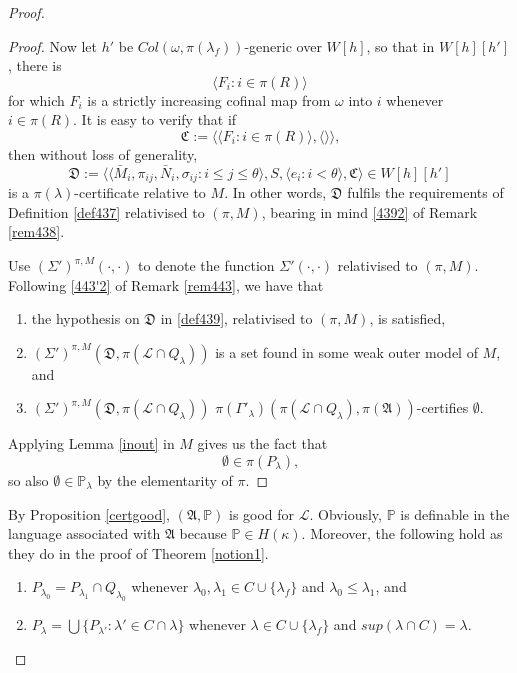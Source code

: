 \documentclass[12pt, twoside]{memoir}
\numberwithin{equation}{section}
\theoremstyle{definition}
\theoremstyle{remark}
\theoremstyle{definition}
\theoremstyle{definition}
\theoremstyle{definition}
\theoremstyle{remark}
\begin{document}
\begin{proof}
\begin{proof}
Now let $h'$ be $Col(\omega, \pi(\lambda_f))$-generic over $W[h]$, so that in $W[h][h']$, there is 
\begin{equation*}
    \langle F_i : i \in \pi(R) \rangle
\end{equation*}
for which $F_i$ is a strictly increasing cofinal map from $\omega$ into $i$ whenever $i \in \pi(R)$. It is easy to verify that if
\begin{equation*}
    \mathfrak{C} := \langle \langle F_i : i \in \pi(R) \rangle, \langle \rangle \rangle \text{,}
\end{equation*}
then without loss of generality,
\begin{equation*}
    \mathfrak{D} := \langle \langle \bar{M}_i, \pi_{ij},  \bar{N}_i, \sigma_{ij} : i \leq j \leq \theta \rangle, S, \langle e_i : i < \theta \rangle, \mathfrak{C} \rangle \in W[h][h']
\end{equation*}
is a $\pi(\lambda)$-certificate relative to $M$. In other words, $\mathfrak{D}$ fulfils the requirements of Definition \ref{def437} relativised to $(\pi, M)$, bearing in mind \ref{4392} of Remark \ref{rem438}. 

Use $(\Sigma')^{\pi, M}(\cdot, \cdot)$ to denote the function $\Sigma'(\cdot, \cdot)$ relativised to $(\pi, M)$. Following \ref{443'2} of Remark \ref{rem443}, we have that
\begin{enumerate}[label=(\alph*)]
    \item the hypothesis on $\mathfrak{D}$ in \ref{def439}, relativised to $(\pi, M)$, is satisfied, 
    \item $(\Sigma')^{\pi, M}(\mathfrak{D}, \pi(\mathcal{L} \cap Q_{\lambda}))$ is a set found in some weak outer model of $M$, and
    \item $(\Sigma')^{\pi, M}(\mathfrak{D}, \pi(\mathcal{L} \cap Q_{\lambda}))$ $\pi(\Gamma'_{\lambda}) (\pi(\mathcal{L} \cap Q_{\lambda}), \pi(\mathfrak{A}))$-certifies $\emptyset$. 
\end{enumerate}
Applying Lemma \ref{inout} in $M$ gives us the fact that 
\begin{equation*}
    \emptyset \in \pi(P_{\lambda}) \text{,}
\end{equation*}
so also $\emptyset \in \mathbb{P}_{\lambda}$ by the elementarity of $\pi$. 
\end{proof}

By Proposition \ref{certgood}, $(\mathfrak{A}, \mathbb{P})$ is good for $\mathcal{L}$. Obviously, $\mathbb{P}$ is definable in the language associated with $\mathfrak{A}$ because $\mathbb{P} \in H(\kappa)$. Moreover, the following hold as they do in the proof of Theorem \ref{notion1}.
\begin{enumerate}[label=(P\arabic*), leftmargin=40pt]
    \item\label{p1'} $P_{\lambda_0} = P_{\lambda_1} \cap Q_{\lambda_0}$ whenever $\lambda_0, \lambda_1 \in C \cup \{\lambda_f\}$ and $\lambda_0 \leq \lambda_1$, and
    \item\label{p2'} $P_{\lambda} = \bigcup \{P_{\lambda'} : \lambda' \in C \cap \lambda\}$ whenever $\lambda \in C \cup \{\lambda_f\}$ and $sup(\lambda \cap C) = \lambda$.
\end{enumerate}


\end{proof}
\end{document}
